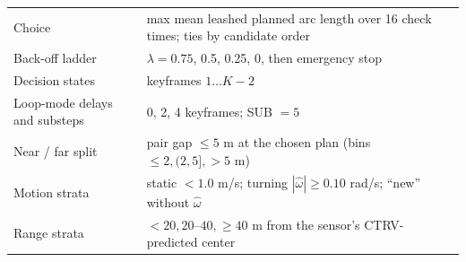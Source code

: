 \documentclass{ieeeaccess}
\begin{document}
\begin{table}[!t]
\begin{tabular}{@{}L{0.282\columnwidth}L{0.688\columnwidth}@{}}
Choice & max mean leashed planned arc length over 16 check times; ties by candidate order \\
Back-off ladder & $\lambda = 0.75$, 0.5, 0.25, 0, then emergency stop \\
Decision states & keyframes $1 \dots K - 2$ \\
Loop-mode delays and substeps & 0, 2, 4 keyframes; SUB $= 5$ \\
Near / far split & pair gap $\leq 5$ m at the chosen plan (bins $\leq 2, (2, 5], > 5$ m) \\
Motion strata & static $< 1.0$ m/s; turning $|\hat{\omega}| \geq 0.10$ rad/s; ``new'' without $\hat{\omega}$ \\
Range strata & $< 20, 20\text{--}40, \geq 40$ m from the sensor's CTRV-predicted center \\
\hline
\end{tabular}
\end{table}
\end{document}
